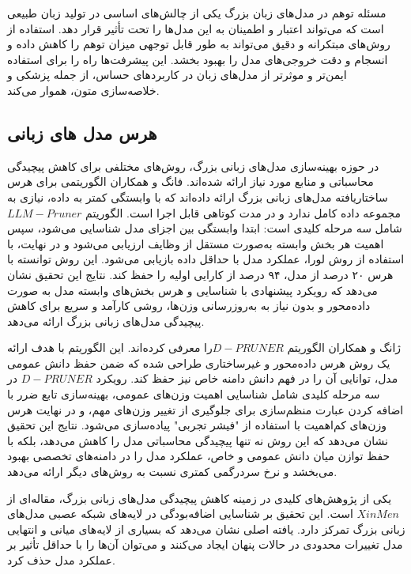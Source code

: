 مسئله توهم در مدل‌های زبان بزرگ یکی از چالش‌های اساسی در تولید زبان طبیعی است که می‌تواند اعتبار و اطمینان به این مدل‌ها را تحت تأثیر قرار دهد. استفاده از روش‌های مبتکرانه و دقیق می‌تواند به طور قابل توجهی میزان توهم را کاهش داده و انسجام و دقت خروجی‌های مدل را بهبود بخشد. این پیشرفت‌ها راه را برای استفاده ایمن‌تر و موثرتر از مدل‌های زبان در کاربردهای حساس، از جمله پزشکی و خلاصه‌سازی متون، هموار می‌کند.

\subsection{هرس مدل های زبانی}

در حوزه بهینه‌سازی مدل‌های زبانی بزرگ، روش‌های مختلفی برای کاهش پیچیدگی محاسباتی و منابع مورد نیاز ارائه شده‌اند.
فانگ و همکاران الگوریتمی برای هرس ساختاریافته مدل‌های زبانی بزرگ ارائه داده‌اند که با وابستگی کمتر به داده، نیازی به مجموعه داده کامل ندارد و در مدت کوتاهی قابل اجرا است. الگوریتم $LLM-Pruner$ شامل سه مرحله کلیدی است: ابتدا وابستگی بین اجزای مدل شناسایی می‌شود، سپس اهمیت هر بخش وابسته به‌صورت مستقل از وظایف  ارزیابی می‌شود و در نهایت، با استفاده از روش لورا، عملکرد مدل با حداقل داده بازیابی می‌شود. این روش توانسته با هرس ۲۰ درصد از مدل، ۹۴ درصد از کارایی اولیه را حفظ کند. نتایج این تحقیق نشان می‌دهد که رویکرد پیشنهادی با شناسایی و هرس بخش‌های وابسته مدل به صورت داده‌محور و بدون نیاز به به‌روزرسانی وزن‌ها، روشی کارآمد و سریع برای کاهش پیچیدگی مدل‌های زبانی بزرگ ارائه می‌دهد\cite{men2024shortgpt}.


 ژانگ و همکاران  الگوریتم $D-PRUNER $را معرفی کرده‌اند. این الگوریتم با هدف ارائه یک روش هرس داده‌محور و غیرساختاری طراحی شده که ضمن حفظ دانش عمومی مدل، توانایی آن را در فهم دانش دامنه خاص نیز حفظ کند. رویکرد $D-PRUNER$ در سه مرحله کلیدی شامل شناسایی اهمیت وزن‌های عمومی، بهینه‌سازی تابع ضرر با اضافه کردن  عبارت منظم‌سازی      برای جلوگیری از تغییر وزن‌های مهم، و در نهایت هرس وزن‌های کم‌اهمیت با استفاده از "فیشر تجربی" پیاده‌سازی می‌شود. نتایج این تحقیق نشان می‌دهد که این روش نه تنها پیچیدگی محاسباتی مدل را کاهش می‌دهد، بلکه با حفظ توازن میان دانش عمومی و خاص، عملکرد مدل را در دامنه‌های تخصصی بهبود می‌بخشد و نرخ سردرگمی  کمتری نسبت به روش‌های دیگر ارائه می‌دهد\cite{zhang2024pruning}.

یکی از پژوهش‌های کلیدی در زمینه کاهش پیچیدگی مدل‌های زبانی بزرگ، مقاله‌ای از $Xin Men$ است. این تحقیق بر شناسایی  اضافه‌بودگی   در لایه‌های شبکه عصبی مدل‌های زبانی بزرگ تمرکز دارد. یافته اصلی نشان می‌دهد که بسیاری از لایه‌های میانی و انتهایی مدل تغییرات محدودی در حالات پنهان ایجاد می‌کنند و می‌توان آن‌ها را با حداقل تأثیر بر عملکرد مدل حذف کرد.

